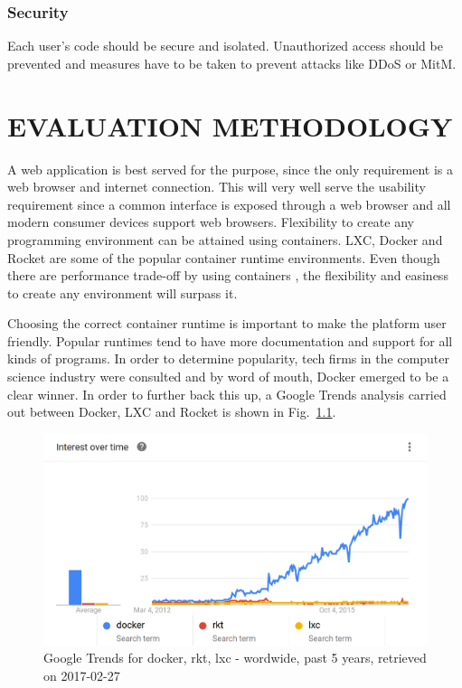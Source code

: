 \documentclass[DD]{iitmdiss}
\begin{document}
\subsection{Security}
Each user's code should be secure and isolated. Unauthorized access should be prevented and measures have to be taken to prevent attacks like DDoS or MitM.

\chapter{EVALUATION METHODOLOGY}

A web application is best served for the purpose, since the only requirement is a web browser and internet connection. This will very well serve the usability requirement since a common interface is exposed through a web browser and all modern consumer devices support web browsers. Flexibility to create any programming environment can be attained using containers. LXC, Docker and Rocket are some of the popular container runtime environments. Even though there are performance trade-off by using containers \citep{ruan_performance_2016}, the flexibility and easiness to create any environment will surpass it.

Choosing the correct container runtime is important to make the platform user friendly. Popular runtimes tend to have more documentation and support for all kinds of programs. In order to determine popularity, tech firms in the computer science industry were consulted and by word of mouth, Docker emerged to be a clear winner. In order to further back this up, a Google Trends analysis carried out between Docker, LXC and Rocket \citep{google_trends_docker_lxc_rkt} is shown in Fig.~\ref{fig:google_trends_docker_rkt_lxc}. 

\begin{figure}
\centering
\includegraphics[width=0.7\linewidth]{img/google_trends_docker_rkt_lxc}
\caption[Google Trends for docker, rkt, lxc]{Google Trends for docker, rkt, lxc - wordwide, past 5 years, retrieved on 2017-02-27}
\label{fig:google_trends_docker_rkt_lxc}
\end{figure}
\end{document}
